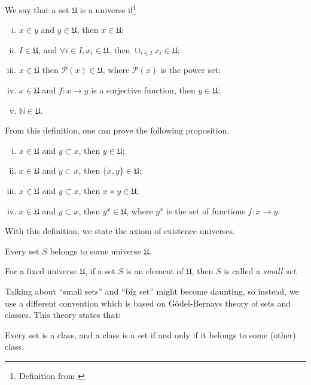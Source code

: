 \begin{definition}[Universe]
  We say that a set $\mathfrak U$ is a universe if\footnote{Definition from \citet{borceux1994handbook}}
  \begin{enumerate}[(i)]
    \item $x\in y$ and $ y\in \mathfrak U$, then $x \in \mathfrak U$;
    \item $I \in \mathfrak U$, and $\forall i \in I, x_i \in \mathfrak U$, then $\cup_{i\in I}x_i \in \mathfrak U$;
    \item $x \in \mathfrak U$ then $\mathcal P(x) \in \mathfrak U$, where $\mathcal P(x)$ is the power set;
    \item $x \in \mathfrak U$ and $f:x\to y$ is a surjective function, then $y \in \mathfrak U$;
    \item $\mathbb N \in \mathfrak U$.
  \end{enumerate}
\end{definition}

From this definition, one can prove the following proposition.
\begin{proposition}
  \begin{enumerate}[(i)]
    \item $x \in \mathfrak U$ and $y \subset x$, then $y \in \mathfrak U$;
    \item $x \in \mathfrak U$ and $y \subset x$, then $\{x,y\} \in \mathfrak U$;
    \item $x \in \mathfrak U$ and $y \subset x$, then $x\times y \in \mathfrak U$;
    \item $x \in \mathfrak U$ and $y \subset x$, then $y^x \in \mathfrak U$, where $y^x$ is the set of functions $f:x \to y$.
  \end{enumerate}
  \label{prop:universe}
\end{proposition}

With this definition, we state the axiom of existence universes.
\begin{axiom}
  Every set $S$ belongs to some universe $\mathfrak U$.
\end{axiom}

\begin{definition}
  For a fixed universe $\mathfrak U$, if a set $S$ is an element of $\mathfrak U$,
  then $S$ is called a \textit{small set}.
\end{definition}

Talking about ``small sets'' and ``big set'' might become daunting, so instead, we
use a different convention which is based on Gödel-Bernays theory of sets and classes.
This theory states that:
\begin{axiom}
  Every set is a class, and a class is a set if and only if it belongs to some (other)
  class.
  \label{axiom:gb}
\end{axiom}

